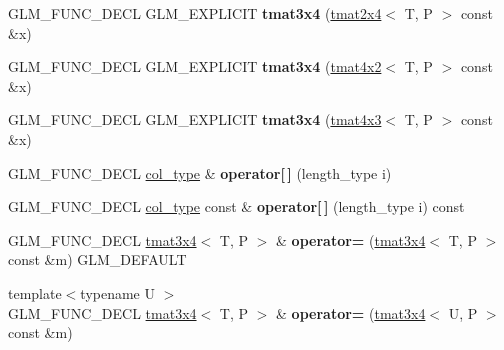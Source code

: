 \begin{DoxyCompactItemize}
\item 
\mbox{\label{structglm_1_1tmat3x4_adb7f132c93b8d8fcdbd577898d77f7b8}} 
G\+L\+M\+\_\+\+F\+U\+N\+C\+\_\+\+D\+E\+CL G\+L\+M\+\_\+\+E\+X\+P\+L\+I\+C\+IT {\bfseries tmat3x4} (\hyperlink{structglm_1_1tmat2x4}{tmat2x4}$<$ T, P $>$ const \&x)
\item 
\mbox{\label{structglm_1_1tmat3x4_a70babe3ae60656b3cbe053ef31327e13}} 
G\+L\+M\+\_\+\+F\+U\+N\+C\+\_\+\+D\+E\+CL G\+L\+M\+\_\+\+E\+X\+P\+L\+I\+C\+IT {\bfseries tmat3x4} (\hyperlink{structglm_1_1tmat4x2}{tmat4x2}$<$ T, P $>$ const \&x)
\item 
\mbox{\label{structglm_1_1tmat3x4_aadf667324b7352d8aadc7bf0680164e1}} 
G\+L\+M\+\_\+\+F\+U\+N\+C\+\_\+\+D\+E\+CL G\+L\+M\+\_\+\+E\+X\+P\+L\+I\+C\+IT {\bfseries tmat3x4} (\hyperlink{structglm_1_1tmat4x3}{tmat4x3}$<$ T, P $>$ const \&x)
\item 
\mbox{\label{structglm_1_1tmat3x4_adba2ef1be4b50bfaa63e5469310f1d87}} 
G\+L\+M\+\_\+\+F\+U\+N\+C\+\_\+\+D\+E\+CL \hyperlink{structglm_1_1tvec4}{col\+\_\+type} \& {\bfseries operator\mbox{[}$\,$\mbox{]}} (length\+\_\+type i)
\item 
\mbox{\label{structglm_1_1tmat3x4_af1fbec08dc06186ec67fb79ceffa3e25}} 
G\+L\+M\+\_\+\+F\+U\+N\+C\+\_\+\+D\+E\+CL \hyperlink{structglm_1_1tvec4}{col\+\_\+type} const  \& {\bfseries operator\mbox{[}$\,$\mbox{]}} (length\+\_\+type i) const
\item 
\mbox{\label{structglm_1_1tmat3x4_abc0355942efae7b2f19e863908c76036}} 
G\+L\+M\+\_\+\+F\+U\+N\+C\+\_\+\+D\+E\+CL \hyperlink{structglm_1_1tmat3x4}{tmat3x4}$<$ T, P $>$ \& {\bfseries operator=} (\hyperlink{structglm_1_1tmat3x4}{tmat3x4}$<$ T, P $>$ const \&m) G\+L\+M\+\_\+\+D\+E\+F\+A\+U\+LT
\item 
\mbox{\label{structglm_1_1tmat3x4_a966fd086e06ed72bed9db6e362ac5cd4}} 
{\footnotesize template$<$typename U $>$ }\\G\+L\+M\+\_\+\+F\+U\+N\+C\+\_\+\+D\+E\+CL \hyperlink{structglm_1_1tmat3x4}{tmat3x4}$<$ T, P $>$ \& {\bfseries operator=} (\hyperlink{structglm_1_1tmat3x4}{tmat3x4}$<$ U, P $>$ const \&m)

\end{DoxyCompactItemize}
